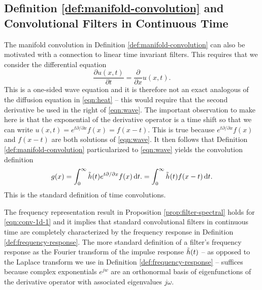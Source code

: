

\subsection{Definition \ref{def:manifold-convolution} and Convolutional Filters in Continuous Time}
\label{app:rem_convolution} 
The manifold convolution in Definition \ref{def:manifold-convolution} can also be motivated with a connection to linear time invariant filters. This requires that we consider the differential equation
%
\begin{equation} \label{eqn:wave}
   \frac{\partial u(x,t)}{\partial t}=  \frac{\partial}{\partial x} u(x,t) \text{.}
\end{equation}
%
This is a one-sided wave equation and it is therefore not an exact analogous of the diffusion equation in \eqref{eqn:heat} -- this would require that the second derivative be used in the right of \eqref{eqn:wave}. The important observation to make here is that the exponential of the derivative operator is a time shift so that we can write $u(x,t) = e^{t\partial/\partial x}f(x) = f(x-t)$. This is true because $e^{t\partial/\partial x}f(x)$ and $f(x-t)$ are both solutions of \eqref{eqn:wave}. It then follows that Definition \ref{def:manifold-convolution} particularized to \eqref{eqn:wave} yields the convolution definition
%
\begin{equation}\label{eqn:conv-1d-1}
    g(x) = \int_{0}^\infty {\ensuremath{\tilde h}}(t) e^{t\partial/\partial x}f(x)\, \text{d}t.
         = \int_{0}^\infty {\ensuremath{\tilde h}}(t) f(x-t) \,\text{d}t.
\end{equation}
%
This is the standard definition of time convolutions. 

The frequency representation result in Proposition \ref{prop:filter-spectral} holds for \eqref{eqn:conv-1d-1} and it implies that standard convolutional filters in continuous time are completely characterized by the frequency response in Definition \ref{def:frequency-response}. The more standard definition of a filter's frequency response as the Fourier transform of the impulse response ${\tilde h}(t)$ -- as opposed to the Laplace transform we use in Definition \ref{def:frequency-response} -- suffices because complex exponentials $e^{jw}$ are an orthonormal basis of eigenfunctions of the derivative operator with associated eigenvalues $j\omega$. 

